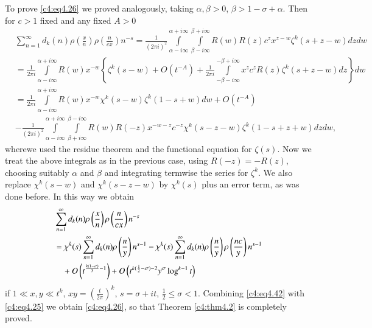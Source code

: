 To prove \eqref{c4:eq4.26} we proved analogously, taking $\alpha,
\beta > 0$, $\beta > 1 - \sigma + \alpha$. Then for $c> 1$ fixed and
any fixed $A> 0$
{\fontsize{9}{11}\selectfont
\begin{align*}
  &\sum_{n=1}^\infty d_k (n) \rho \left(\frac{x}{n} \right) \rho
  \left(\frac{n}{cx} \right)n^{-s}
   = \frac{1}{(2 \pi i)^2} \int\limits^{\alpha + i \infty}_{\alpha - i \infty} \int\limits_{\beta - i \infty}^{\beta + i
    \infty} R(w) R(z) c^z x^{z-w} \zeta^k (s + z - w)dz dw\\
 & = \frac{1}{2 \pi i} \int\limits_{\alpha- i \infty}^{\alpha+ i
    \infty} R(w)x^{-w} \left\{\zeta^k (s-w) + O(t^{-A})+ \frac{1}{2
    \pi i} \int\limits_{- \beta - i \infty}^{-\beta + i \infty} x^z
  c^z R(z) \zeta^k (s+ z-w)dz \right\}dw\\
 & = \frac{1}{2 \pi i} \int\limits_{\alpha - i \infty}^{\alpha + i
    \infty} R(w) x^{-w} \chi^k (s- w) \zeta^k (1- s+ w)dw +
  O(t^{-A})\\
  & - \frac{1}{(2 \pi i)^2} \int\limits_{\alpha - i \infty}^{\alpha +
    i\infty} \int\limits_{\beta + i\infty}^{\beta - i \infty} R(w)
  R(-z) x^{- w-z}c^{-z} \chi^k (s- z -w) \zeta^k (1-s + z+w) dz dw,
\end{align*}}
where\pageoriginale we used the residue theorem and the functional equation for
$\zeta (s)$. Now we treat the above integrals as in the previous case,
using $R(-z)= - R (z)$, choosing suitably $\alpha$ and $\beta$ and
integrating termwise the series for $\zeta^k$. We also replace $\chi^k
(s-w)$ and $\chi^k (s- z -w)$ by $\chi^k (s)$ plus an error term, as
was done before. In this way we obtain 
\begin{align}
  & \sum_{n=1}^\infty d_k (n) \rho \left(\frac{x}{n}\right) \rho
  \left(\frac{n}{cx}  \right) n^{-s}\label{c4:eq4.42}\\
  & = \chi^k (s) \sum_{n=1}^\infty d_k (n) \rho \left(\frac{n}{y}
  \right)n^{s-1} - \chi^k (s) \sum_{n=1}^\infty d_k (n) \rho
  \left(\frac{n}{y} \right) \rho \left(\frac{nc}{y} \right) n^{s-1}\notag\\
  &\quad + O \left(t^{\frac{k(1-\sigma)}{3}-1} \right) + O\left(t^{k(\frac{1}{2} - \sigma) - 2} y^{\sigma} \log^{k-1} t\right) \notag
\end{align}
if $1 \ll x, y \ll t^k$, $xy = \left(\frac{t}{2 \pi}\right)^k$, $s =
\sigma + it$, $\frac{1}{2} \leq \sigma <1$. Combining
\eqref{c4:eq4.42} with \eqref{c4:eq4.25} we obtain \eqref{c4:eq4.26},
so that Theorem \ref{c4:thm4.2} is completely proved. 

